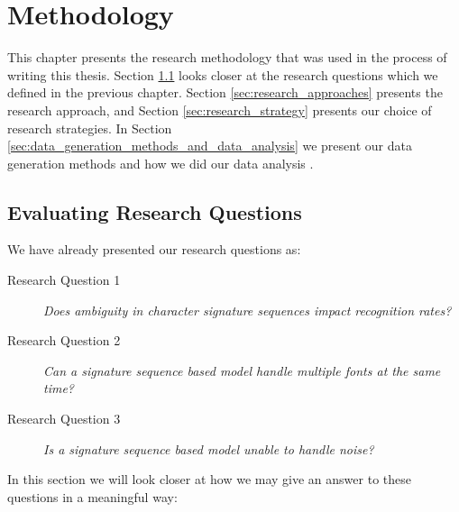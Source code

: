 
\chapter{Methodology}
\label{ch:methodology}
This chapter presents the research methodology that was used in the process of writing this thesis. Section \ref{sec:research_questions_and_approach} looks closer at the research questions which we defined in the previous chapter. Section \ref{sec:research_approaches} presents the research approach, and Section \ref{sec:research_strategy} presents our choice of research strategies. In Section \ref{sec:data_generation_methods_and_data_analysis} we present our data generation methods and how we did our data analysis .


\section{Evaluating Research Questions}
\label{sec:research_questions_and_approach}
We have already presented our research questions as:

\begin{description}
    \item[Research Question 1]{\textit{Does ambiguity in character signature sequences impact recognition rates?}}
    \item[Research Question 2]{\textit{Can a signature sequence based model handle multiple fonts at the same time?}}
    \item[Research Question 3]{\textit{Is a signature sequence based model unable to handle noise?}}
\end{description}

\newpage
In this section we will look closer at how we may give an answer to these questions in a meaningful way:

